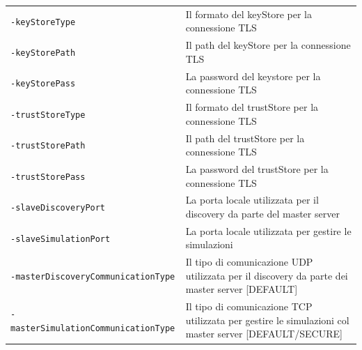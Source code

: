 \begin{table}[H]
    \begin{tabularx}{\linewidth}{ l X }
        \texttt{-keyStoreType}        & Il formato del keyStore per la connessione TLS       \\
        \texttt{-keyStorePath}        & Il path del keyStore per la connessione TLS           \\
        \texttt{-keyStorePass}        & La password del keystore per la connessione TLS        \\
        \texttt{-trustStoreType}      & Il formato del trustStore per la connessione TLS     \\
        \texttt{-trustStorePath}      & Il path del trustStore per la connessione TLS         \\
        \texttt{-trustStorePass}      & La password del trustStore per la connessione TLS     \\
        \texttt{-slaveDiscoveryPort}                & La porta locale utilizzata per il discovery da parte del master server                                              \\
        \texttt{-slaveSimulationPort} & La porta locale utilizzata per gestire le simulazioni \\
        \texttt{-masterDiscoveryCommunicationType}  & Il tipo di comunicazione UDP utilizzata per il discovery da parte dei master server {[}DEFAULT{]}               \\
        \texttt{-masterSimulationCommunicationType} & Il tipo di comunicazione TCP utilizzata per gestire le simulazioni col master server {[}DEFAULT/SECURE{]}
    \end{tabularx}
\end{table}